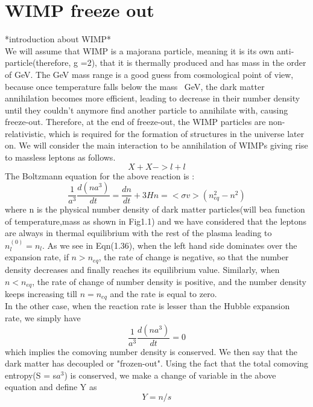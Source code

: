 \documentclass[12pt,a4paper,oneside]{book}
\begin{document}
\section{WIMP freeze out}
*introduction about WIMP* \\
We will assume that WIMP is a majorana particle, meaning it is its own anti-particle(therefore, g =2), that it is thermally produced and has mass in the order of GeV. The GeV mass range is a good guess from cosmological point of view, because once temperature falls below the mass~ GeV, the dark matter annihilation becomes more efficient, leading to decrease in their number density until they couldn't anymore find another particle to annihilate with, causing freeze-out. Therefore, at the end of freeze-out, the WIMP particles are non-relativistic, which is required for the formation of structures in the universe later on. We will consider the main interaction to be annihilation of WIMPs giving rise to massless leptons as follows.
\begin{equation}
        X + X -> l + l
\end{equation}
The Boltzmann equation for the above reaction is :
\begin{equation}
    \frac{1}{a^3}\frac{d(na^3)}{dt} = \frac{dn}{dt} + 3Hn = <\sigma v> (n_{eq}^2 - n^2)
\end{equation}
where n is the physical number density of dark matter particles(will bea function of temperature,mass as shown in  Fig1.1) and we have considered that the leptons are always in thermal equilibrium with the rest of the plasma leading to $n_{l}^{(0)} = n_{l}$. As we see in Eqn(1.36), when the left hand side dominates over the expansion rate, if $n >  n_{eq}$, the rate of change is negative, so that the number density decreases and finally reaches its equilibrium value. Similarly, when $n < n_{eq}$, the rate of change of number density is positive, and the number density keeps increasing till $n = n_{eq}$ and the rate is equal to zero.\\ In the other case, when the reaction rate is lesser than the Hubble expansion rate, we simply have
\begin{equation*}
     \frac{1}{a^3}\frac{d(na^3)}{dt} = 0
\end{equation*}
which implies the comoving number density is conserved. We then say that the dark matter has decoupled or "frozen-out". Using the fact that the total comoving entropy(S = s$a^3$) is conserved, we make a change of variable in the above equation and define Y as
\begin{equation}
     Y  = n/s
\end{equation}
\end{document}

